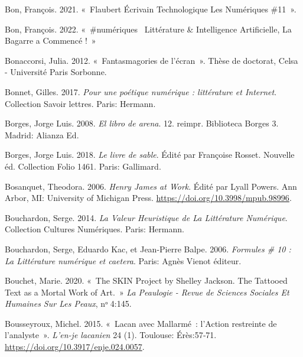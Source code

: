 \begin{CSLReferences}{1}{0}
\leavevmode{}%
Bon, François. 2021. {«~Flaubert {É}crivain Technologique \textbar{} Les
Num{é}riques \#11~»}.

\leavevmode{}%
Bon, François. 2022. {«~\#num{é}riques \textbar~Litt{é}rature \&
Intelligence Artificielle, La Bagarre a Commenc{é} !~»}

\leavevmode{}%
Bonaccorsi, Julia. 2012. {«~{Fantasmagories de l'{é}cran}~»}. Thèse de
doctorat, Celsa - Universit{é} Paris Sorbonne.

\leavevmode{}%
Bonnet, Gilles. 2017. \emph{{Pour une po{é}tique num{é}rique :
litt{é}rature et Internet}}. {Collection Savoir lettres}. {Paris}:
{Hermann}.

\leavevmode{}%
Borges, Jorge Luis. 2008. \emph{{El libro de arena}}. 12. reimpr.
{Biblioteca Borges} 3. {Madrid}: {Alianza Ed}.

\leavevmode{}%
Borges, Jorge Luis. 2018. \emph{{Le livre de sable}}. Édité par
Françoise Rosset. Nouvelle {é}d. {Collection Folio} 1461. {Paris}:
{Gallimard}.

\leavevmode{}%
Bosanquet, Theodora. 2006. \emph{Henry {James} at {Work}}. Édité par
Lyall Powers. {Ann Arbor, MI}: {University of Michigan Press}.
\url{https://doi.org/10.3998/mpub.98996}.

\leavevmode{}%
Bouchardon, Serge. 2014. \emph{La Valeur Heuristique de La Litt{é}rature
Num{é}rique}. Collection {Cultures} Num{é}riques. {Paris}: {Hermann}.

\leavevmode{}%
Bouchardon, Serge, Eduardo Kac, et Jean-Pierre Balpe. 2006.
\emph{{Formules \# 10 : La Litt{é}rature num{é}rique et caetera}}.
{Paris}: {Agn{è}s Vienot {é}diteur}.

\leavevmode{}%
Bouchet, Marie. 2020. {«~The {SKIN Project} by {Shelley Jackson}. {The
Tattooed Text} as a {Mortal Work} of {Art}.~»} \emph{La Peaulogie -
Revue de Sciences Sociales Et Humaines Sur Les Peaux}, nᵒ 4:145.

\leavevmode{}%
Bousseyroux, Michel. 2015. {«~{Lacan avec Mallarm{é}~: l'Action
restreinte de l'analyste}~»}. \emph{L'en-je lacanien} 24 (1).
{Toulouse}: {{É}r{è}s}:57‑71.
\url{https://doi.org/10.3917/enje.024.0057}.


\end{CSLReferences}
